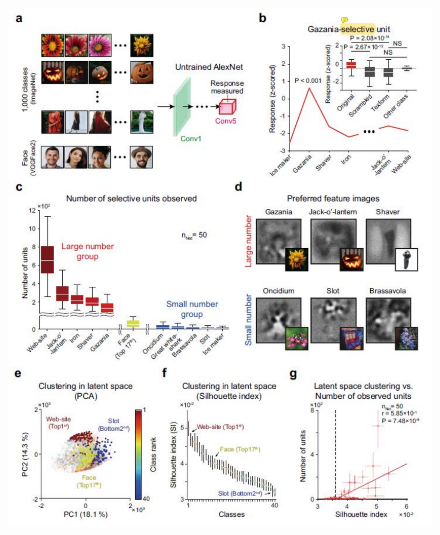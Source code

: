 \documentclass[final,3p,times,twocolumn]{elsarticle}
\begin{document}
\begin{figure}[htbp]
	\centering
	
	\subfigure%
	{
		\begin{minipage}[t]{1.0\linewidth}
			\centering
			\includegraphics[width=1.0\textwidth]{figs/fig_5_a-f_1.pdf}
		\end{minipage}%
	}%
	

\end{figure}
\end{document}
